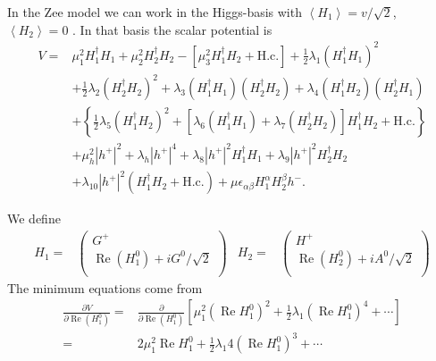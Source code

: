 In the Zee model we can work in the Higgs-basis with $\left\langle H_1 \right\rangle=v/\sqrt{2}$,  $\left\langle H_2 \right\rangle=0$ \cite{AristizabalSierra:2006ri}. In that basis the scalar potential is
\begin{align}
  \label{eq:scalarpotentialinhiggsbas}
  V  = & \mu^{2}_{1}H_{1}^{\dagger}H_{1}
  + \mu^{2}_{2}H_{2}^{\dagger}H_{2}
  - [\mu^{2}_{3}H_{1}^{\dagger}H_{2} + \mbox{H.c.}]
  + \frac{1}{2}\lambda_{1}(H_{1}^{\dagger}H_{1})^{2}
  \nonumber\\
  & + \frac{1}{2}\lambda_{2}(H_{2}^{\dagger}H_{2})^{2}
  + \lambda_{3}(H_{1}^{\dagger}
  H_{1})(H_{2}^{\dagger}H_{2})
  + \lambda_{4}(H_{1}^{\dagger}
  H_{2})(H_{2}^{\dagger}H_{1})
  \nonumber\\
  & + \left\{
    \frac{1}{2}\lambda_{5}(H_{1}^{\dagger}H_{2})^{2}
    + [\lambda_{6}(H_{1}^{\dagger}H_{1})
    + \lambda_{7}(H_{2}^{\dagger}H_{2})]
    H_{1}^{\dagger}H_{2}
    +\mbox{H.c.}
  \right\}
  \nonumber\\
  & + \mu_{h}^{2}|h^{+}|^{2} + \lambda_{h}|h^{+}|^{4}
  + \lambda_{8}|h^{+}|^{2}H_{1}^{\dagger}H_{1} 
  + \lambda_{9}|h^{+}|^{2}H_{2}^{\dagger}H_{2}
  \nonumber\\
  & + \lambda_{10}|h^{+}|^{2}(H_{1}^\dagger H_{2}
  + \mbox{H.c.})
  + \mu\epsilon_{\alpha\beta}H_{1}^{\alpha}
  H_{2}^{\beta}h^{-}.
\end{align}

We define
\begin{align}
  H_1=&
  \begin{pmatrix}
    G^{+}\\
    \operatorname{Re}\left( H_1^{0} \right)+i G^{0}/\sqrt{2}\\
  \end{pmatrix}&
  H_2=&
  \begin{pmatrix}
    H^{+}\\
    \operatorname{Re}\left( H_2^{0} \right)+i A^{0}/\sqrt{2}\\
  \end{pmatrix}
\end{align}
The minimum equations come from
\begin{align}
  \frac{\partial V}{\partial \operatorname{Re}\left( H_1^{0} \right)}=&
\frac{\partial }{\partial \operatorname{Re}\left( H_1^{0} \right)} \left[ 
\mu^{2}_{1}\left(\operatorname{Re}H_{1}^{0}  \right)^2
+\frac{1}{2}\lambda_1 \left(\operatorname{Re}H_{1}^{0}  \right)^4+\cdots  \right]\nonumber\\
=&2\mu^{2}_{1}\operatorname{Re}H_{1}^{0}  
+\frac{1}{2}\lambda_1 4 \left(\operatorname{Re}H_{1}^{0}  \right)^3+\cdots
\end{align}


